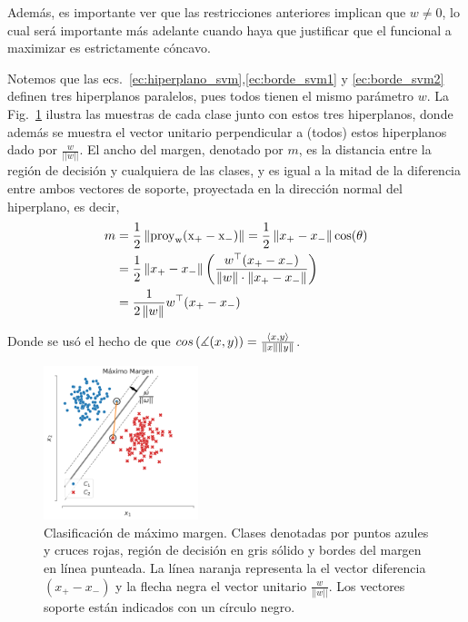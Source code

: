  Además, es importante ver que las restricciones anteriores implican que $w\neq 0$, lo cual será importante más adelante cuando haya que justificar que el funcional a maximizar es estrictamente cóncavo.

Notemos que las ecs.~\eqref{ec:hiperplano_svm},\eqref{ec:borde_svm1} y \eqref{ec:borde_svm2} definen tres hiperplanos paralelos, pues todos tienen el mismo parámetro $w$. La Fig.~\ref{fig:clasif_margen} ilustra las muestras de cada clase junto con estos tres hiperplanos, donde además se muestra el vector unitario perpendicular a (todos) estos hiperplanos dado por $\frac{w}{||w||}$. El ancho del {margen}, denotado por $m$, es la distancia entre la región de decisión y cualquiera de las clases, y es igual a la mitad de la diferencia entre ambos vectores de soporte, proyectada en la dirección normal del hiperplano, es decir, 
\begin{align}
m &= \frac{1}{2} \norm{\operatorfont{proy}_w(x_+-x_-)} = \frac{1}{2} \norm{x_+-x_-}\cos(\theta) \\
&= \frac{1}{2}\norm{x_+-x_-} \left(\frac{w^\top(x_+-x_-)}{\norm{w}\cdot\norm{x_+-x_-}}\right)\\
& =\frac{1}{2\norm{w}} w^\top(x_+ - x_-)
\end{align}

Donde se usó el hecho de que $cos\left(\measuredangle(x,y)\right) = \frac{\langle x,y\rangle}{\left\lVert x\right\rVert\left\lVert y\right\rVert}$.

\begin{figure}[ht]
    \centering
    \includegraphics[width=0.4\textwidth]{img/cap5_max_margen2.pdf}
    \caption{Clasificación de máximo margen. Clases denotadas por puntos azules y cruces rojas, región de decisión en gris sólido y bordes del margen en línea punteada. La línea naranja representa la  el vector diferencia $(x_+ - x_{-})$ y la flecha negra el vector unitario $\frac{w}{||w||}$. Los vectores soporte están indicados con un círculo negro.}
    \label{fig:clasif_margen}
\end{figure}

